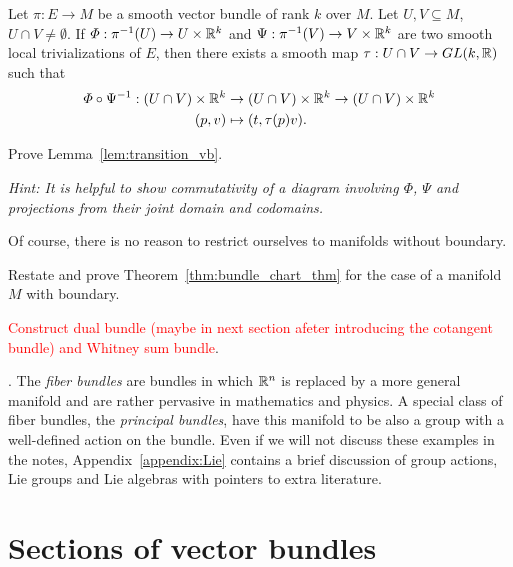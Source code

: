 \begin{lemma}\label{lem:transition_vb}
  Let $\pi:E \to M$ be a smooth vector bundle of rank $k$ over $M$. Let $U,V\subseteq M$, $U\cap V\neq \emptyset$.
  If $\varPhi : \pi^{-1}(U) \to U \times \mathbb{R}^k$ and $\Psi: \pi^{-1}(V) \to V \times \mathbb{R}^k$ are two smooth local trivializations of $E$, then there exists a smooth map $\tau: U\cap V \to GL(k, \mathbb{R})$ such that
  \begin{align}
    \varPhi\circ\Psi^{-1} : (U\cap V)\times\mathbb{R}^k &\to (U\cap V)\times \mathbb{R}^k \to (U\cap V)\times \mathbb{R}^k \\
                            (p,v) &\mapsto (t, \tau(p) v).
  \end{align}
\end{lemma}
\begin{exercise}
  Prove Lemma~\ref{lem:transition_vb}.

  \textit{\small Hint: It is helpful to show commutativity of a diagram involving $\varPhi$, $\Psi$ and projections from their joint domain and codomains.}
\end{exercise}

Of course, there is no reason to restrict ourselves to manifolds without boundary.
\begin{exercise}
  Restate and prove Theorem~\ref{thm:bundle_chart_thm} for the case of a manifold $M$ with boundary.
\end{exercise}

\begin{exercise}
  \textcolor{red}{Construct dual bundle (maybe in next section afeter introducing the cotangent bundle) and Whitney sum bundle}.
\end{exercise}

.
The \emph{fiber bundles} are bundles in which $\mathbb{R}^n$ is replaced by a more general manifold and are rather pervasive in mathematics and physics.
A special class of fiber bundles, the \emph{principal bundles}, have this manifold to be also a group with a well-defined action on the bundle.
Even if we will not discuss these examples in the notes, Appendix~\ref{appendix:Lie} contains a brief discussion of group actions, Lie groups and Lie algebras with pointers to extra literature.

\section{Sections of vector bundles}

